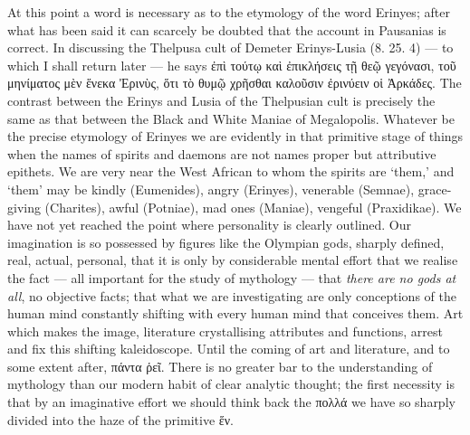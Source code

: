 \documentclass[a4paper, 11pt, oneside, polutonikogreek, english]{article}
\begin{document}
At this point a word is necessary as to the etymology of the word Erinyes; after what has been said it can scarcely be doubted that the account in Pausanias is correct. In discussing the Thelpusa cult of Demeter Erinys-Lusia (8. 25. 4) --- to which I shall return later --- he says ἐπὶ τούτῳ καὶ ἐπικλήσεις τῇ θεῷ γεγόνασι, τοῦ μηνίματος μὲν ἕνεκα Ἐρινὺς, ὅτι τὸ θυμῷ χρῆσθαι καλοῦσιν ἐρινύειν οἱ Ἀρκάδες. The contrast between the Erinys and Lusia of the Thelpusian cult is precisely the same as that between the Black and White Maniae of Megalopolis. Whatever be the precise etymology of Erinyes we are evidently in that primitive stage of things when the names of spirits and daemons are not names proper but attributive epithets. We are very near the West African to whom the spirits are `them,' and `them' may be kindly (Eumenides), angry (Erinyes), venerable (Semnae), grace-giving (Charites), awful (Potniae), mad ones (Maniae), vengeful (Praxidikae). We have not yet reached the point where personality is clearly outlined. Our imagination is so possessed by figures like the Olympian gods, sharply defined, real, actual, personal, that it is only by considerable mental effort that we realise the fact --- all important for the study of mythology --- that \emph{there are no gods at all}, no objective facts; that what we are investigating are only conceptions of the human mind constantly shifting with every human mind that conceives them. Art which makes the image, literature crystallising attributes and functions, arrest and fix this shifting kaleidoscope. Until the coming of art and literature, and to some extent after, πάντα ῥεῖ. There is no greater bar to the understanding of mythology than our modern habit of clear analytic thought; the first necessity is that by an imaginative effort we should think back the πολλά we have so sharply divided into the haze of the primitive ἕν.
\end{document}
